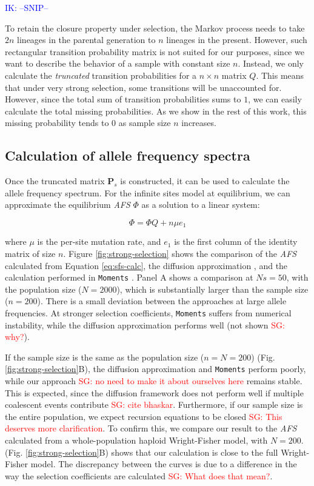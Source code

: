 \documentclass[review]{elsarticle}
\newcommand{\sgcomment}[1]{\textcolor{red}{SG: #1}}
\newcommand{\ikcomment}[1]{\textcolor{blue}{IK: #1}}
\begin{document}
\ikcomment{--SNIP--}

To retain the closure property under selection, the Markov process needs to take $2n$ lineages in
the parental generation to $n$ lineages in the present. However, such rectangular transition
probability matrix is not suited for our purposes, since we want to describe the behavior of a
sample with constant size $n$. Instead, we only calculate the \textit{truncated} transition
probabilities for a $n \times n$ matrix $Q$. This means that under very strong selection, some
transitions will be unaccounted for. However, since the total sum of transition probabilities sums
to $1$, we can easily calculate the total missing probabilities. As we show in the rest of this
work, this missing probability tends to $0$ as sample size $n$ increases.


\subsection{Calculation of allele frequency spectra}
\label{subsec:afs}

Once the truncated matrix $\mathbf{P}_s$ is constructed, it can be used to calculate the allele frequency
spectrum. For the infinite sites model at equilibrium, we can approximate the equilibrium
\textit{AFS} $\Phi$ as a solution to a linear system:

\begin{equation}
  \label{eq:sfs-calc}
  \Phi = \Phi Q + n \mu e_1
\end{equation}

where $\mu$ is the per-site mutation rate, and $e_1$ is the first column of the identity matrix of
size $n$. Figure \ref{fig:strong-selection} shows the comparison of the \textit{AFS} calculated from
Equation \eqref{eq:sfs-calc}, the diffusion approximation \cite[eq. 9.23]{Ewens2004}, and the
calculation performed in \texttt{Moments} \citep{JouganousEtAl2017}. Panel A shows a comparison at
$Ns=50$, with the population size ($N=2000$), which is substantially larger than the sample size
($n=200$). There is a small deviation between the approaches at large allele frequencies. At
stronger selection coefficients, \texttt{Moments} suffers from numerical instability, while the
diffusion approximation performs well (not shown \sgcomment{why?}).

If the sample size is the same as the population size ($n=N=200$) (Fig.
\ref{fig:strong-selection}B), the diffusion approximation and \texttt{Moments} perform poorly, while
our approach \sgcomment{no need to make it about ourselves here} remains stable. This is expected, since the diffusion framework does not perform well
if multiple coalescent events contribute \sgcomment{cite bhaskar}. Furthermore, if our sample size is the entire population,
we expect recursion equations to be closed \sgcomment{This deserves more clarification}. To confirm this, we compare our result to the
\textit{AFS} calculated from a whole-population haploid Wright-Fisher model, with $N=200$. (Fig.
\ref{fig:strong-selection}B) shows that our calculation is close to the full Wright-Fisher model.
The discrepancy between the curves is due to a difference in the way the selection coefficients are
calculated \sgcomment{What does that mean?}.
\end{document}
